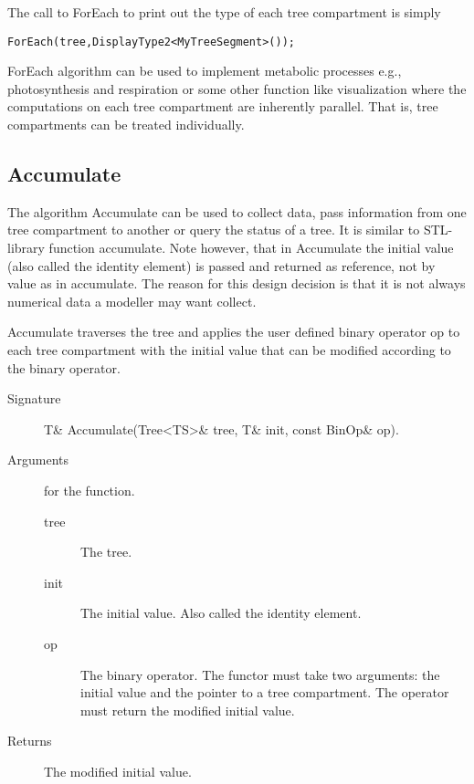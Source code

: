 The call to ForEach to print out the type of each tree compartment is
simply 

\begin{verbatim}
ForEach(tree,DisplayType2<MyTreeSegment>());
\end{verbatim}

ForEach  algorithm can be used to  implement metabolic processes e.g.,
photosynthesis   and respiration     or some  other   function    like
visualization where the computations  on   each tree compartment   are
inherently parallel.  That   is,  tree  compartments can  be   treated
individually.

\subsection{Accumulate}

The algorithm Accumulate can be used to collect data, pass information
from one tree compartment to another or query the status of a tree. It
is similar to STL-library  function accumulate.  Note however, that in
Accumulate  the initial value  (also called  the identity  element) is
passed and returned as reference,  not by value as in accumulate.  The
reason for  this design  decision is that  it is not  always numerical
data a modeller may want collect.

Accumulate traverses  the tree  and  applies the user  defined  binary
operator op to each  tree compartment with the  initial value that can
be modified according to the binary operator.

\begin{description}
   \item [Signature] T\& Accumulate(Tree<TS>\& tree, T\& init, const BinOp\& op).
   \item [Arguments] for the function.
     \begin{description}
        \item [tree] The tree.
        \item [init] The initial value. Also called the identity
     element.
        \item [op] The binary operator. The functor must take two
     arguments: the initial value and the pointer to a tree compartment. The
     operator must return the modified initial value.
     \end{description} 
   \item[Returns] The  modified initial value.
\end{description} 


